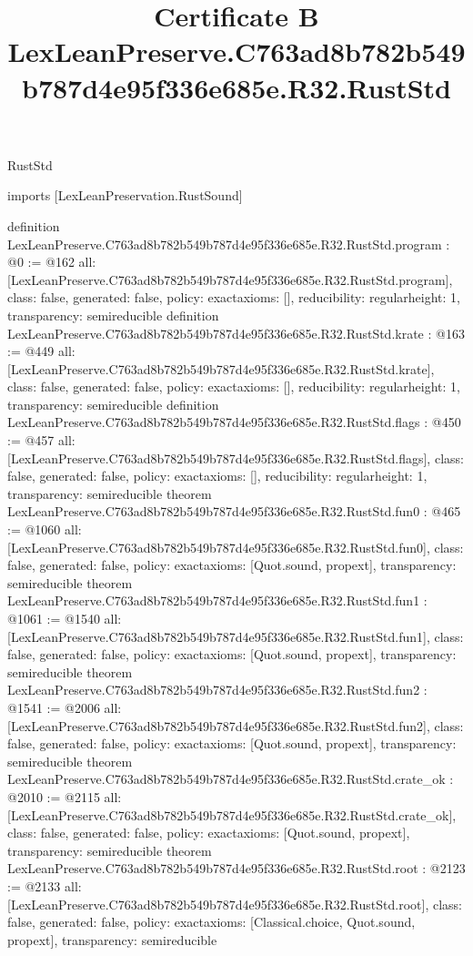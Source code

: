 \begin{lexlean}{RustStd}
\title{Certificate B LexLeanPreserve.C763ad8b782b549b787d4e95f336e685e.R32.RustStd}
\begin{coremodule}
imports [LexLeanPreservation.RustSound]

definition LexLeanPreserve.C763ad8b782b549b787d4e95f336e685e.R32.RustStd.program : @0 := @162 {
  all: [LexLeanPreserve.C763ad8b782b549b787d4e95f336e685e.R32.RustStd.program],
  class: false,
  generated: false,
  policy: exact{axioms: []},
  reducibility: regular{height: 1},
  transparency: semireducible
}
definition LexLeanPreserve.C763ad8b782b549b787d4e95f336e685e.R32.RustStd.krate : @163 := @449 {
  all: [LexLeanPreserve.C763ad8b782b549b787d4e95f336e685e.R32.RustStd.krate],
  class: false,
  generated: false,
  policy: exact{axioms: []},
  reducibility: regular{height: 1},
  transparency: semireducible
}
definition LexLeanPreserve.C763ad8b782b549b787d4e95f336e685e.R32.RustStd.flags : @450 := @457 {
  all: [LexLeanPreserve.C763ad8b782b549b787d4e95f336e685e.R32.RustStd.flags],
  class: false,
  generated: false,
  policy: exact{axioms: []},
  reducibility: regular{height: 1},
  transparency: semireducible
}
theorem LexLeanPreserve.C763ad8b782b549b787d4e95f336e685e.R32.RustStd.fun0 : @465 := @1060 {
  all: [LexLeanPreserve.C763ad8b782b549b787d4e95f336e685e.R32.RustStd.fun0],
  class: false,
  generated: false,
  policy: exact{axioms: [Quot.sound, propext]},
  transparency: semireducible
}
theorem LexLeanPreserve.C763ad8b782b549b787d4e95f336e685e.R32.RustStd.fun1 : @1061 := @1540 {
  all: [LexLeanPreserve.C763ad8b782b549b787d4e95f336e685e.R32.RustStd.fun1],
  class: false,
  generated: false,
  policy: exact{axioms: [Quot.sound, propext]},
  transparency: semireducible
}
theorem LexLeanPreserve.C763ad8b782b549b787d4e95f336e685e.R32.RustStd.fun2 : @1541 := @2006 {
  all: [LexLeanPreserve.C763ad8b782b549b787d4e95f336e685e.R32.RustStd.fun2],
  class: false,
  generated: false,
  policy: exact{axioms: [Quot.sound, propext]},
  transparency: semireducible
}
theorem LexLeanPreserve.C763ad8b782b549b787d4e95f336e685e.R32.RustStd.crate_ok : @2010 := @2115 {
  all: [LexLeanPreserve.C763ad8b782b549b787d4e95f336e685e.R32.RustStd.crate_ok],
  class: false,
  generated: false,
  policy: exact{axioms: [Quot.sound, propext]},
  transparency: semireducible
}
theorem LexLeanPreserve.C763ad8b782b549b787d4e95f336e685e.R32.RustStd.root : @2123 := @2133 {
  all: [LexLeanPreserve.C763ad8b782b549b787d4e95f336e685e.R32.RustStd.root],
  class: false,
  generated: false,
  policy: exact{axioms: [Classical.choice, Quot.sound, propext]},
  transparency: semireducible
}


\end{coremodule}
\end{lexlean}
